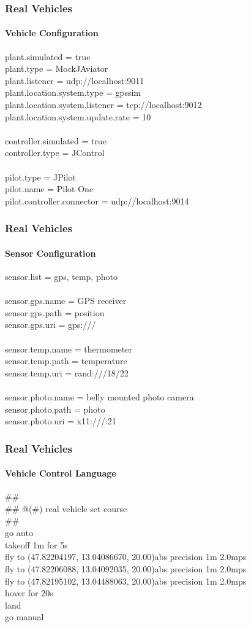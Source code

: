 \documentclass{beamer}
\begin{document}
\begin{frame}\frametitle{Real Vehicles}\framesubtitle{Vehicle Configuration}
plant.simulated = true \\
plant.type = MockJAviator \\
plant.listener = udp://localhost:9011 \\
plant.location.system.type = gpssim \\
plant.location.system.listener = tcp://localhost:9012 \\
plant.location.system.update.rate = 10 \\
 \\
controller.simulated = true \\
controller.type = JControl \\
 \\
pilot.type = JPilot \\
pilot.name = Pilot One \\
pilot.controller.connector = udp://localhost:9014
\end{frame}


\begin{frame}\frametitle{Real Vehicles}\framesubtitle{Sensor Configuration}
sensor.list = gps, temp, photo \\
\\
sensor.gps.name = GPS receiver \\
sensor.gps.path = position \\
sensor.gps.uri = gps:/// \\
\\
sensor.temp.name = thermometer \\
sensor.temp.path = temperature \\
sensor.temp.uri = rand:///18/22 \\
\\
sensor.photo.name = belly mounted photo camera \\
sensor.photo.path = photo \\
sensor.photo.uri = x11:///:21
\end{frame}


\begin{frame}\frametitle{Real Vehicles}\framesubtitle{Vehicle Control Language}
\#\# \\
\#\# @(\#) real vehicle set course \\
\#\# \\
go auto \\
takeoff 1m for 5s \\
fly to (47.82204197, 13.04086670, 20.00)abs precision 1m 2.0mps \\
fly to (47.82206088, 13.04092035, 20.00)abs precision 1m 2.0mps \\
fly to (47.82195102, 13.04488063, 20.00)abs precision 1m 2.0mps \\
hover for 20s \\
land \\
go manual
\end{frame}
\end{document}
